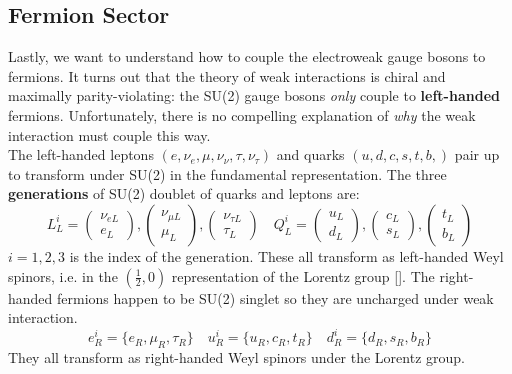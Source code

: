 \documentclass[../main.tex]{subfiles}
\begin{document}
\subsection{Fermion Sector}
Lastly, we want to understand how to couple the electroweak gauge bosons to fermions. It turns out that the theory of weak interactions is chiral and maximally parity-violating: the SU(2) gauge bosons \textit{only} couple to \textbf{left-handed} fermions. Unfortunately, there is no compelling explanation of \textit{why} the weak interaction must couple this way.\\
The left-handed leptons $(e,\nu_e,\mu,\nu_\nu,\tau,\nu_\tau)$ and quarks $(u,d,c,s,t,b,)$ pair up to transform under SU(2) in the fundamental representation. The three \textbf{generations} of SU(2) doublet of quarks and leptons are:
\[
L_L^i=\begin{pmatrix}
    \nu_{eL}\\
    e_L
\end{pmatrix}, \begin{pmatrix}
    \nu_{\mu L}\\
    \mu_L
\end{pmatrix}, \begin{pmatrix}
    \nu_{\tau L}\\
    \tau_L
\end{pmatrix}
\quad
Q_L^i=\begin{pmatrix}
    u_L\\
    d_L
\end{pmatrix}, \begin{pmatrix}
    c_L\\
    s_L
\end{pmatrix}, \begin{pmatrix}
    t_L\\
    b_L
\end{pmatrix}
\]
$i=1,2,3$ is the index of the generation. These all transform as left-handed Weyl spinors, i.e. in the $\left(\frac{1}{2},0\right)$ representation of the Lorentz group []. The right-handed fermions happen to be SU(2) singlet so they are uncharged under weak interaction.
\[
e_R^i=\{e_R,\mu_R,\tau_R\} \quad u_R^i=\{u_R,c_R,t_R\} \quad d_R^i=\{d_R,s_R,b_R\}
\]
They all transform as right-handed Weyl spinors under the Lorentz group.\\
\end{document}
